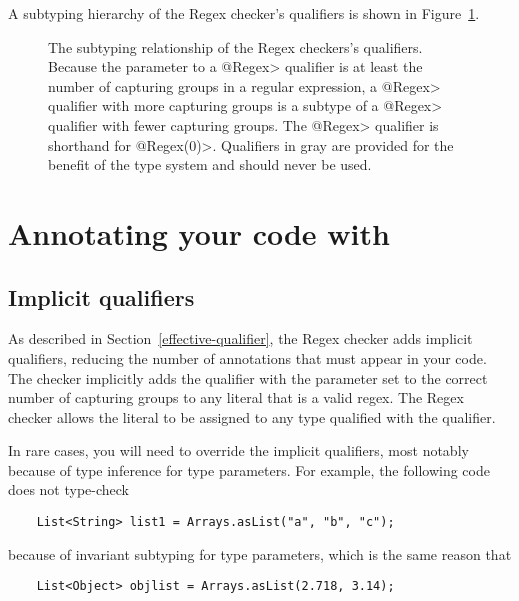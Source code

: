 A subtyping hierarchy of the Regex checker's qualifiers is shown in
Figure~\ref{fig:regex-hierarchy}.

\begin{figure}
\caption{The subtyping relationship of the Regex checkers's qualifiers.
  Because the parameter to a \<@Regex> qualifier is at least the number of
  capturing groups in a regular expression, a \<@Regex> qualifier with more
  capturing groups is a subtype of a \<@Regex> qualifier with fewer capturing
  groups. The \<@Regex> qualifier is shorthand for \<@Regex(0)>. Qualifiers
  in gray are provided for the benefit of the type
  system and should never be used.}
\label{fig:regex-hierarchy}
\end{figure}

\section{Annotating your code with \label{annotating-with-regex}}


\subsection{Implicit qualifiers\label{regex-implicit-qualifiers}}

As described in Section~\ref{effective-qualifier}, the Regex checker adds
implicit qualifiers, reducing the number of annotations that must appear
in your code. The checker implicitly adds the  qualifier with
the parameter set to the correct number of capturing groups to
any  literal that is a valid regex. The Regex checker allows
the  literal to be assigned to any type qualified with the
 qualifier.

In rare cases, you will need to override the implicit qualifiers, most
notably because of type inference for type parameters.  For
example, the following code does not type-check

\begin{Verbatim}
    List<String> list1 = Arrays.asList("a", "b", "c");
\end{Verbatim}

\noindent
because of invariant subtyping for type parameters, which is the same reason that

\begin{Verbatim}
    List<Object> objlist = Arrays.asList(2.718, 3.14);
\end{Verbatim}

